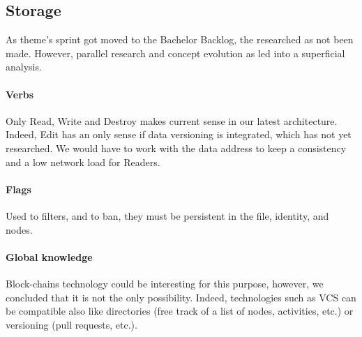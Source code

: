 
\subsection{Storage}
As theme's sprint got moved to the Bachelor Backlog, the researched as not been made. However, parallel research and concept evolution as led into a superficial analysis.

\paragraph{Verbs} Only Read, Write and Destroy makes current sense in our latest architecture. Indeed, Edit has an only sense if data versioning is integrated, which has not yet researched. We would have to work with the data address to keep a consistency and a low network load for Readers.

\paragraph{Flags} Used to filters, and to ban, they must be persistent in the file, identity, and nodes.

\paragraph{Global knowledge} Block-chains technology could be interesting for this purpose, however, we concluded that it is not the only possibility. Indeed, technologies such as VCS can be compatible also like directories (free track of a list of nodes, activities, etc.) or versioning (pull requests, etc.).


